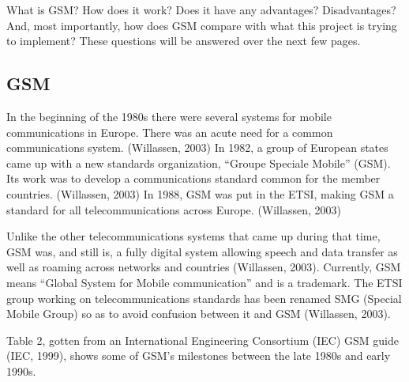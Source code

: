 \documentclass[12pt,svgnames,smaller]{article} %
\begin{document}
	What is GSM? How does it work? Does it have any advantages? Disadvantages? And, most importantly, how does GSM compare with what this project is trying to implement? These questions will be answered over the next few pages.
	
	\subsection{GSM}
	
	In the beginning of the 1980s there were several systems for mobile communications in Europe. There was an acute need for a common communications system. (Willassen, 2003) In 1982, a group of European states came up with a new standards organization, “Groupe Speciale Mobile” (GSM). Its work was to develop a communications standard common for the member countries. (Willassen, 2003) In 1988, GSM was put in the ETSI, making GSM a standard for all telecommunications across Europe. (Willassen, 2003)
	
	Unlike the other telecommunications systems that came up during that time, GSM was, and still is, a fully digital system allowing speech and data transfer as well as roaming across networks and countries (Willassen, 2003). Currently, GSM means “Global System for Mobile communication” and is a trademark. The ETSI group working on telecommunications standards has been renamed SMG (Special Mobile Group) so as to avoid confusion between it and GSM (Willassen, 2003).
	
	Table 2, gotten from an International Engineering Consortium (IEC) GSM guide (IEC, 1999), shows some of GSM’s milestones between the late 1980s and early 1990s.
	
\end{document}

